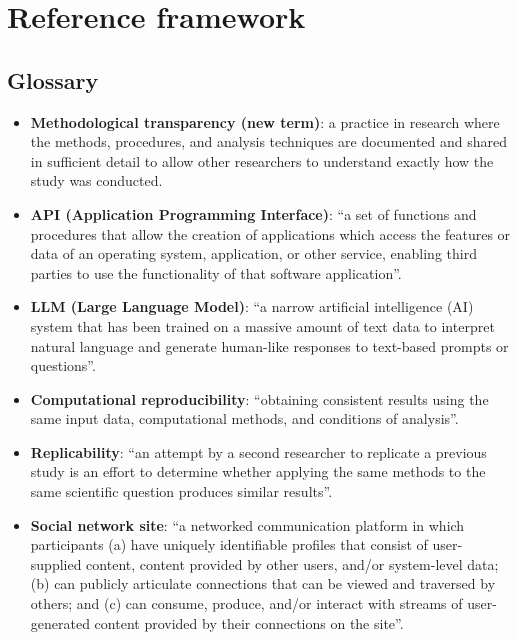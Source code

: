 \section{Reference framework}

\subsection{Glossary}

\begin{itemize}
	\item \textbf{Methodological transparency (new term)}: a practice in research where the methods, procedures, and analysis techniques are documented and shared in sufficient detail to allow other researchers to understand exactly how the study was conducted.

	\item \textbf{API (Application Programming Interface)}: \enquote{a set of functions and procedures that allow the creation of applications which access the features or data of an operating system, application, or other service, enabling third parties to use the functionality of that software application}. \parencite{sciencedirect_api}

	\item \textbf{LLM (Large Language Model)}: \enquote{a narrow artificial intelligence (AI) system that has been trained on a massive amount of text data to interpret natural language and generate human-like responses to text-based prompts or questions}. \parencite{almarie2023llm}

	\item \textbf{Computational reproducibility}: \enquote{obtaining consistent results using the same input data, computational methods, and conditions of analysis}. \parencite{nasem2019reproducibility}

	\item \textbf{Replicability}: \enquote{an attempt by a second researcher to replicate a previous study is an effort to determine whether applying the same methods to the same scientific question produces similar results}. \parencite{nasem2019reproducibility}

	\item \textbf{Social network site}: \enquote{a networked communication platform in which participants (a) have uniquely identifiable profiles that consist of user-supplied content, content provided by other users, and/or system-level data; (b) can publicly articulate connections that can be viewed and traversed by others; and (c) can consume, produce, and/or interact with streams of user-generated content provided by their connections on the site}. \parencite{aichner2021socialmedia}


\end{itemize}
